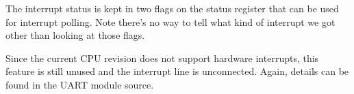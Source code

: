     The interrupt status is kept in two flags on the status register that can 
    be used for interrupt polling. Note there's no way to tell what kind of
    interrupt we got other than looking at those flags.
    
    Since the current CPU revision does not support hardware interrupts, this
    feature is still unused and the interrupt line is unconnected.
    Again, details can be found in the UART module source.

        
    
    
    





    
    
    